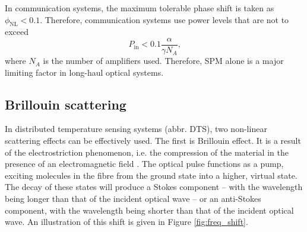 \documentclass{standalone}
\begin{document}
In communication systems, the maximum tolerable phase shift is taken as $\phi_\textrm{NL} < 0.1$. Therefore, communication systems use power levels that are not to exceed
\begin{equation}
P_\textrm{in} < 0.1 \frac{\alpha}{\gamma N_A} \textrm{,}
\end{equation}
where $N_A$ is the number of amplifiers used. Therefore, SPM alone is a major limiting factor in long-haul optical systems.


\subsection{Brillouin scattering}

In distributed temperature sensing systems (abbr. DTS), two non-linear scattering effects can be effectively used. The first is Brillouin effect. It is a result of the electrostriction phenomenon, i.e. the compression of the material in the presence of an electromagnetic field \cite{agrawalNonlinear}. The optical pulse functions as a pump, exciting molecules in the fibre from the ground state into a higher, virtual state. The decay of these states will produce a Stokes component -- with the wavelength being longer than that of the incident optical wave -- or an anti-Stokes component, with the wavelength being shorter than that of the incident optical wave. An illustration of this shift is given in Figure \ref{fig:freq_shift}.
\end{document}
